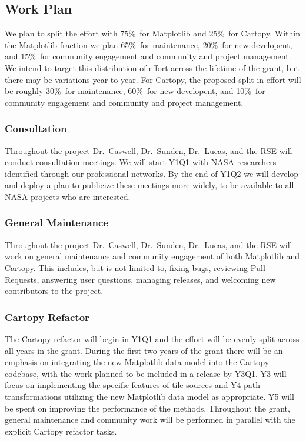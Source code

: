 \documentclass[12pt]{article}
\numberwithin{page}{section}
\begin{document}
\subsection{Work Plan}

We plan to split the effort with 75\%\ for Matplotlib and 25\%\ for Cartopy.
Within the Matplotlib fraction we plan 65\%\ for maintenance, 20\%\ for new
developent, and 15\%\ for
community
engagement and community and project management.  We intend to target this distribution
of effort across the lifetime of the grant, but there may be variations year-to-year.
For Cartopy, the proposed split in effort will be roughly
30\%\ for maintenance, 60\%\ for new
developent, and 10\%\ for
community
engagement and community and project management.

\subsubsection{Consultation}
Throughout the project Dr.\ Caswell, Dr.\ Sunden, Dr.\ Lucas, and the RSE
will conduct consultation meetings.  We will start Y1Q1 with NASA researchers
identified through our professional networks.  By the end of Y1Q2 we will
develop and deploy a plan to publicize these meetings more widely, to be available to
all NASA projects who are interested.

\subsubsection{General Maintenance}

Throughout the project Dr.\ Caswell, Dr.\ Sunden, Dr.\ Lucas, and the RSE
will work on general maintenance and community engagement of both Matplotlib
and Cartopy.  This includes, but is not limited to, fixing bugs, reviewing Pull
Requests, answering user questions, managing releases, and welcoming new
contributors to the project.


\subsubsection{Cartopy Refactor}

The Cartopy refactor will begin in Y1Q1
and the effort will be evenly split across all years in the grant.
During the first two years of the grant there will be an emphasis on
integrating the new Matplotlib data model into the Cartopy codebase,
with the work planned to be included in a release by Y3Q1.
Y3 will focus on implementing the specific
features of tile sources and Y4 path transformations utilizing the new
Matplotlib data model as appropriate. Y5 will be spent on
improving the performance of the methods. Throughout the grant, general
maintenance and community work will be performed in parallel with the
explicit Cartopy refactor tasks.
\end{document}
